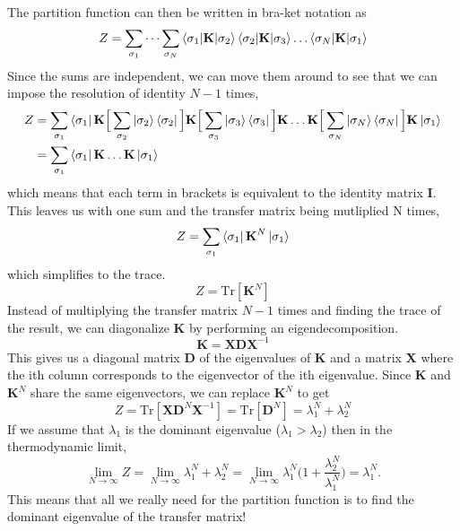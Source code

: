 \documentclass{article}
\newcommand{\be}{\begin{equation}}
\newcommand{\ee}{\end{equation}}
\newcommand{\tk}{\textbf{K}}
\newcommand{\ti}{\textbf{I}}
\begin{document}
The partition function can then be written in bra-ket notation as
\be
  Z = \sum_{\sigma_1} \dots \sum_{\sigma_N} \braket{\sigma_1 | \tk | \sigma_2} \braket{\sigma_2 | \tk | \sigma_3} \dots \braket{\sigma_N | \tk | \sigma_1}
\ee
Since the sums are independent, we can move them around to see that we can impose the resolution of identity $N - 1$ times,
\be
  \begin{split}
    Z &= \sum_{\sigma_1} \bra{\sigma_1} \tk \Big[ \sum_{\sigma_2} \ket{\sigma_2} \bra{\sigma_2} \Big] \tk \Big[ \sum_{\sigma_3} \ket{\sigma_3} \bra{\sigma_3} \Big] \tk \dots \tk \Big[ \sum_{\sigma_N} \ket{\sigma_N} \bra{\sigma_N} \Big] \tk \ket{\sigma_1} \\
    &= \sum_{\sigma_1} \bra{\sigma_1} \tk \dots \tk \ket{\sigma_1}
  \end{split}
\ee
which means that each term in brackets is equivalent to the identity matrix \ti.
This leaves us with one sum and the transfer matrix being mutliplied N times,
\be
  Z = \sum_{\sigma_1} \bra{\sigma_1} \tk^N \ket{\sigma_1}
\ee
which simplifies to the trace.
\be
  Z = \text{Tr}[\tk^N]
\ee
Instead of multiplying the transfer matrix $N - 1$ times and finding the trace of the result, we can diagonalize \textbf{K} by performing an eigendecomposition.
\be
  \tk = \textbf{X} \textbf{D} \textbf{X}^{-1}
\ee
This gives us a diagonal matrix \textbf{D} of the eigenvalues of \textbf{K} and a matrix \textbf{X} where the ith column corresponds to the eigenvector of the ith eigenvalue.
Since \textbf{K} and $\tk^N$ share the same eigenvectors, we can replace $\tk^N$ to get
\be
  Z = \text{Tr}[\textbf{X} \textbf{D}^N \textbf{X}^{-1}] = \text{Tr}[\textbf{D}^N] = \lambda_1^N + \lambda_2^N
\ee
If we assume that $\lambda_1$ is the dominant eigenvalue ($\lambda_1 > \lambda_2$) then in the thermodynamic limit,
\be
  \lim_{N \to \infty} Z = \lim_{N \to \infty} \lambda_1^N + \lambda_2^N = \lim_{N \to \infty} \lambda_1^N \Big(1 + \frac{\lambda_2^N}{\lambda_1^N} \Big)  = \lambda_1^N .
\ee
This means that all we really need for the partition function is to find the dominant eigenvalue of the transfer matrix!



\end{document}
